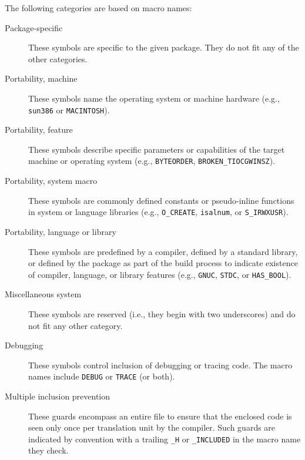 The following categories are based on macro names:

\begin{description}

\item[Package-specific] 
  These symbols are specific to the given package.  They do not fit any of
  the other categories.

\item[Portability, machine]
  These symbols name the operating system or machine
  hardware (e.g., \texttt{sun386} or \texttt{MACINTOSH}).
      
\item[Portability, feature] These symbols describe specific parameters
      or capabilities of the target machine or operating system (e.g.,
      \texttt{BYTEORDER}, \verb|BROKEN_TIOCGWINSZ|).  
      

\item[Portability, system macro]
  These symbols are commonly defined constants or
  pseudo-inline functions in system or language libraries (e.g.,
  \verb|O_CREATE|, \texttt{isalnum}, or \verb|S_IRWXUSR|).

\item[Portability, language or library]
  These symbols are predefined by a compiler, defined by a standard
  library, or defined by the package as part of the build
  process to indicate existence of compiler, language, or library features
  (e.g., \texttt{GNUC}, \texttt{STDC}, or \verb|HAS_BOOL|).

\item[Miscellaneous system]
  These symbols are reserved (i.e., they begin with two underscores) and do
  not fit any other category.
      
\item[Debugging]
  These symbols control inclusion of debugging or tracing code.  The macro
  names include \texttt{DEBUG} or \texttt{TRACE} (or both).
      
\item[Multiple inclusion prevention]
  These guards encompass an entire file to ensure that the enclosed code is
  seen only once per translation unit by the compiler.  Such guards are
  indicated by convention with a trailing \verb|_H| or \verb|_INCLUDED| in the macro name
  they check.
\end{description}


